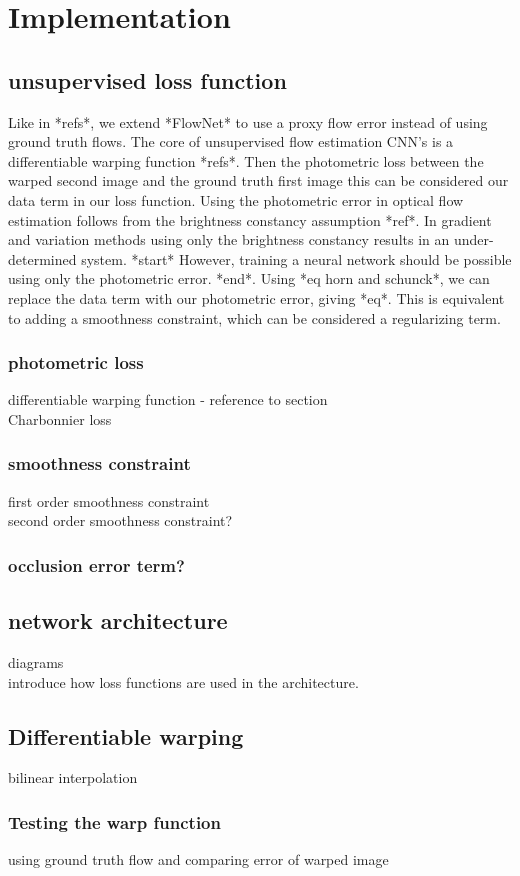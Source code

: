 
\section{Implementation}



\subsection{unsupervised loss function}
Like in *refs*, we extend *FlowNet* to use a proxy flow error instead of using ground truth flows. The core of unsupervised flow estimation CNN's is a differentiable warping function *refs*. Then the photometric loss between the warped second image and the ground truth first image this can be considered our data term in our loss function. Using the photometric error in optical flow estimation follows from the brightness constancy assumption *ref*. In gradient and variation methods using only the brightness constancy results in an under-determined system. *start* However, training a neural network should be possible using only the photometric error. *end*. Using *eq horn and schunck*, we can replace the data term with our photometric error, giving *eq*. This is equivalent to adding a smoothness constraint, which can be considered a regularizing term.

\subsubsection{photometric loss}
differentiable warping function - reference to section\\
Charbonnier loss\\

\subsubsection{smoothness constraint}
first order smoothness constraint\\
second order smoothness constraint?\\

\subsubsection{occlusion error term?}

\subsection{network architecture}
diagrams\\
introduce how loss functions are used in the architecture.\\

\subsection{Differentiable warping}
bilinear interpolation\\

\subsubsection{Testing the warp function}
using ground truth flow and comparing error of warped image\\

